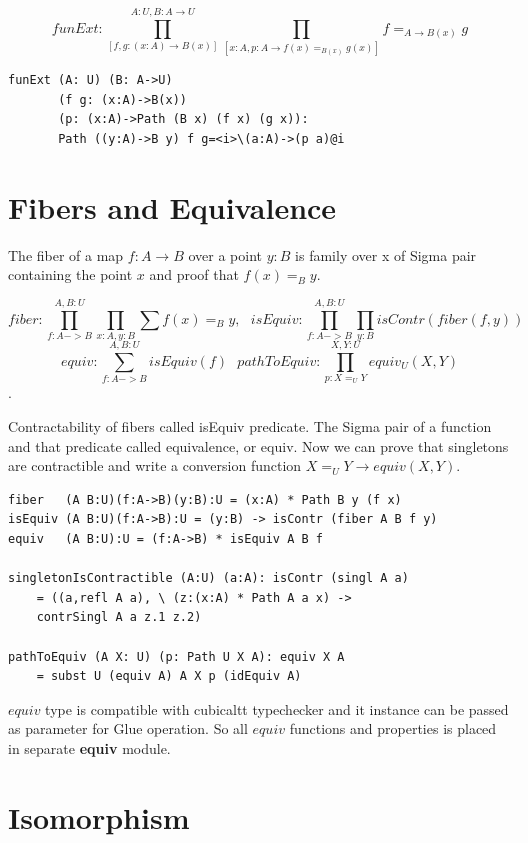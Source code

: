 \documentclass{svproc}
\begin{document}
$$funExt: \prod_{[f,g: (x:A) \rightarrow B(x)]}^{A: U,B:A\rightarrow U}\prod_{[x:A,p:A\rightarrow f(x) =_{B(x)} g(x)]} f =_{A\rightarrow B(x)} g$$

\begin{lstlisting}[mathescape=true]
funExt (A: U) (B: A->U)
       (f g: (x:A)->B(x))
       (p: (x:A)->Path (B x) (f x) (g x)):
       Path ((y:A)->B y) f g=<i>\(a:A)->(p a)@i
\end{lstlisting}

\section{Fibers and Equivalence}

The fiber of a map $f : A \rightarrow B$ over a point $y : B$ is family over x
of Sigma pair containing the point $x$ and proof that $f(x)=_B y$.

$$fiber : \prod_{f:A->B}^{A,B:U}\prod_{x:A,y:B}\sum f(x) =_B y,\ \ \ 
  isEquiv : \prod_{f:A->B}^{A,B:U}\prod_{y:B} isContr(fiber(f,y))$$
$$equiv : \sum_{f:A->B}^{A,B:U} isEquiv(f) \ \ \ 
  pathToEquiv: \prod_{p: X =_U Y}^{X,Y:U} equiv_U(X,Y)$$.

Contractability of fibers called isEquiv predicate. The Sigma pair of
a function and that predicate called equivalence, or equiv. Now we
can prove that singletons are contractible and write a conversion
function $X=_U Y \rightarrow equiv(X,Y)$.

\begin{lstlisting}[mathescape=true]
fiber   (A B:U)(f:A->B)(y:B):U = (x:A) * Path B y (f x)
isEquiv (A B:U)(f:A->B):U = (y:B) -> isContr (fiber A B f y)
equiv   (A B:U):U = (f:A->B) * isEquiv A B f

singletonIsContractible (A:U) (a:A): isContr (singl A a)
    = ((a,refl A a), \ (z:(x:A) * Path A a x) ->
    contrSingl A a z.1 z.2)

pathToEquiv (A X: U) (p: Path U X A): equiv X A
    = subst U (equiv A) A X p (idEquiv A)
\end{lstlisting}

$equiv$ type is compatible with cubicaltt typechecker and it instance
can be passed as parameter for Glue operation. So all $equiv$ functions and properties
is placed in separate {\bf equiv} module.

\section{Isomorphism}
\end{document}
